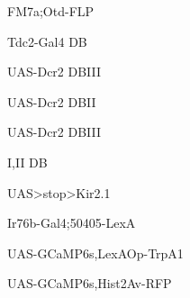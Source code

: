 \documentclass[17pt]{extarticle}
\begin{document}
\footnotesize
\newpage\vspace*{-0.15cm}
\begin{normalsize}
FM7a;Otd-FLP \\[0.5em]
\end{normalsize}
\footnotesize
\newpage\vspace*{-0.15cm}
\begin{normalsize}
Tdc2-Gal4 DB \\[0.5em]
\end{normalsize}
\footnotesize
\newpage\vspace*{-0.15cm}
\begin{normalsize}
UAS-Dcr2 DBIII \\[0.5em]
\end{normalsize}
\footnotesize
\newpage\vspace*{-0.15cm}
\begin{normalsize}
UAS-Dcr2 DBII \\[0.5em]
\end{normalsize}
\footnotesize
\newpage\vspace*{-0.15cm}
\begin{normalsize}
UAS-Dcr2 DBIII \\[0.5em]
\end{normalsize}
\footnotesize
\newpage\vspace*{-0.15cm}
\begin{large}
I,II DB \\[0.5em]
\end{large}
\footnotesize
\newpage\vspace*{-0.15cm}
\begin{normalsize}
UAS>stop>Kir2.1 \\[0.5em]
\end{normalsize}
\footnotesize
\newpage\vspace*{-0.15cm}
\begin{footnotesize}
Ir76b-Gal4;50405-LexA \\[0.5em]
\end{footnotesize}
\footnotesize
\newpage\vspace*{-0.15cm}
\begin{footnotesize}
UAS-GCaMP6s,LexAOp-TrpA1 \\[0.5em]
\end{footnotesize}
\footnotesize
\newpage\vspace*{-0.15cm}
\begin{footnotesize}
UAS-GCaMP6s,Hist2Av-RFP \\[0.5em]
\end{footnotesize}
\end{document}
